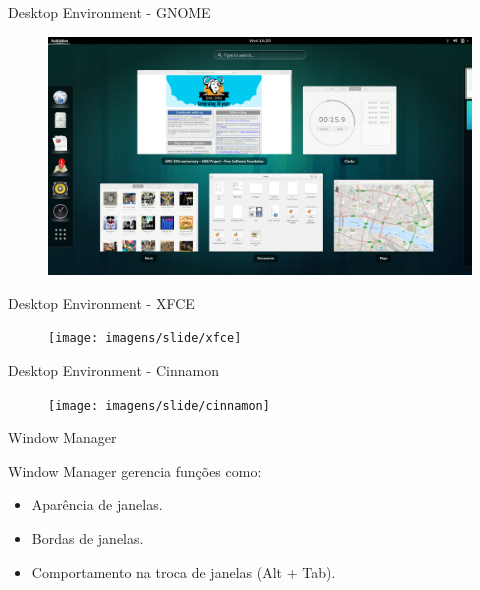 \documentclass[size=14pt,
style=paintings
]{powerdot}
\newenvironment{vslide}{\vspace{\stretch{1}}}{\vspace{\stretch{1}}}
\begin{document}
\begin{slide}{Desktop Environment - GNOME}
  \centering
   \begin{figure}[!h]
  \includegraphics[scale=0.25]{imagens/slide/gnome}
   \end{figure}
\end{slide}

\begin{slide}{Desktop Environment - XFCE}
  \centering
   \begin{figure}[!h]
  \texttt{[image: imagens/slide/xfce]}
   \end{figure}
\end{slide}

\begin{slide}{Desktop Environment - Cinnamon}
  \centering
   \begin{figure}[!h]
  \texttt{[image: imagens/slide/cinnamon]}
   \end{figure}
\end{slide}

\begin{slide}{Window Manager}
\begin{vslide}

Window Manager gerencia funções como:

\begin{itemize}
\setlength{\itemsep}{0.5cm}
\item Aparência de janelas.
\item Bordas de janelas.
\item Comportamento na troca de janelas (Alt + Tab).
\end{itemize}

\end{vslide}
\end{slide}
\end{document}
